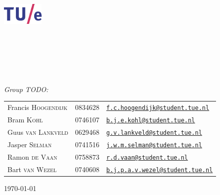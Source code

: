 \begin{titlepage}
	\begin{center}

		\includegraphics[width=0.15\textwidth]{Images/tuelogo}\\[1cm]

		\textsc{\LARGE \uni}\\[0.2cm]

		\textsc{\fase}\\[1.6cm]

        \textsc{\LARGE \vak}\\[0.5cm]

\HRule \\[0.4cm]
{ \huge \bfseries \essaytitle}\\[0.4cm]

\HRule \\[1.5cm]

	\emph{Group TODO:}\\
    \begin{tabular}{l l l}
	Francis \textsc{Hoogendijk} & 0834628 & \href{mailto:f.c.hoogendijk@student.tue.nl}{\texttt{f.c.hoogendijk@student.tue.nl}}\\
	Bram \textsc{Kohl} & 0746107 & \href{mailto:b.j.e.kohl@student.tue.nl}{\texttt{b.j.e.kohl@student.tue.nl}}\\
	Guus \textsc{van Lankveld} & 0629468 & \href{mailto:g.v.lankveld@student.tue.nl}{\texttt{g.v.lankveld@student.tue.nl}}\\
	Jasper \textsc{Selman} & 0741516 & \href{mailto:j.w.m.selman@student.tue.nl}{\texttt{j.w.m.selman@student.tue.nl}}\\
	Ramon \textsc{de Vaan} & 0758873 & \href{mailto:r.d.vaan@student.tue.nl}{\texttt{r.d.vaan@student.tue.nl}}\\
	Bart \textsc{van Wezel} & 0740608 & \href{mailto:b.j.p.a.v.wezel@student.tue.nl}{\texttt{b.j.p.a.v.wezel@student.tue.nl}}
    \end{tabular}
		\vfill

		{\large \today} \\
		\stad

	\end{center}
\end{titlepage} 